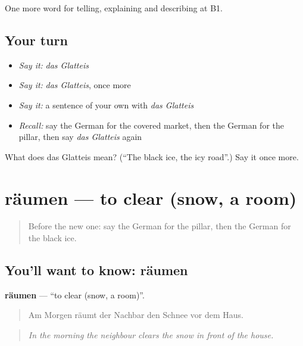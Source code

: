 \begin{grammarlens}[title={What you've built}]
One more word for telling, explaining and describing at B1.
\end{grammarlens}

\subsection*{Your turn}
\begin{itemize}
\raggedright
  \item \emph{Say it:} \emph{das Glatteis}
  \item \emph{Say it:} \emph{das Glatteis}, once more
  \item \emph{Say it:} a sentence of your own with \emph{das Glatteis}
  \item \emph{Recall:} say the German for the covered market, then the German for the pillar, then say \emph{das Glatteis} again
\end{itemize}

\begin{tcolorbox}[breakable,colback=teal!4,colframe=teal!35!black,title={Before you move on}]
What does das Glatteis mean? (\textquotedblleft{}The black ice, the icy road\textquotedblright{}.) Say it once more.
\end{tcolorbox}
\section[räumen]{räumen — to clear (snow, a room)}

\label{lesson:GE-C442-raeumen}



\begin{quote}
Before the new one: say the German for the pillar, then the German for the black ice.
\end{quote}

\subsection*{You'll want to know: räumen}
\textbf{räumen} — \textquotedblleft{}to clear (snow, a room)\textquotedblright{}.

\begin{quote}
Am Morgen räumt der Nachbar den Schnee vor dem Haus.
\end{quote}

\begin{quote}
\emph{In the morning the neighbour clears the snow in front of the house.}
\end{quote}

